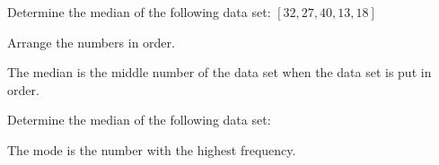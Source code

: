 \documentclass{ximera}
\begin{document}
\begin{question}
Determine the median of the following data set: $[32, 27, 40, 13, 18]$
  \begin{solution}
    \begin{multiple-choice}
    \end{multiple-choice}
    \begin{hint}
      Arrange the numbers in order.
    \end{hint}
    \begin{hint}
      The median is the middle number of the data set when the data set is put in order.
    \end{hint}
  \end{solution}
\end{question}

\begin{question}
Determine the median of the following data set:
\begin{image}
\end{image}

  \begin{solution}
    \begin{multiple-choice}
    \end{multiple-choice}
    \begin{hint}
      The mode is the number with the highest frequency.
    \end{hint}
  \end{solution}
\end{question}
\end{document}
